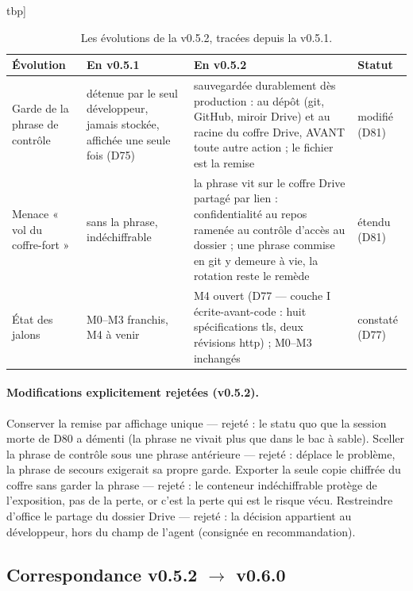 \begin{table}tbp]
\centering\small
\caption{Les évolutions de la v0.5.2, tracées depuis la v0.5.1.}
\label{tab:correspondance052}
\begin{tabularx}{\textwidth}{@{}l Y Y l@{}}
\toprule
\textbf{Évolution} & \textbf{En v0.5.1} & \textbf{En v0.5.2} & \textbf{Statut} \\
\midrule
Garde de la phrase de contrôle & détenue par le seul développeur, jamais stockée,
affichée une seule fois (D75) & sauvegardée durablement dès production :
 au dépôt (git, GitHub, miroir Drive) et au racine du
coffre Drive, AVANT toute autre action ; le fichier est la remise & modifié (D81) \\
Menace « vol du coffre-fort » & sans la phrase, indéchiffrable & la phrase vit sur le
coffre Drive partagé par lien : confidentialité au repos ramenée au contrôle d'accès au
dossier ; une phrase commise en git y demeure à vie, la rotation reste le remède &
étendu (D81) \\
État des jalons & M0–M3 franchis, M4 à venir & M4 ouvert (D77 — couche I
écrite-avant-code : huit spécifications tls, deux révisions http) ; M0–M3 inchangés &
constaté (D77) \\
\bottomrule
\end{tabularx}
\end{table}

\paragraph{Modifications explicitement rejetées (v0.5.2).} Conserver la remise par
affichage unique — rejeté : le statu quo que la session morte de D80 a démenti (la
phrase ne vivait plus que dans le bac à sable). Sceller la phrase de contrôle sous une
phrase antérieure — rejeté : déplace le problème, la phrase de secours exigerait sa
propre garde. Exporter la seule copie chiffrée du coffre sans garder la phrase — rejeté :
le conteneur indéchiffrable protège de l'exposition, pas de la perte, or c'est la perte
qui est le risque vécu. Restreindre d'office le partage du dossier Drive — rejeté : la
décision appartient au développeur, hors du champ de l'agent (consignée en
recommandation).

\subsection{Correspondance v0.5.2 $\to$ v0.6.0}\label{sec:evolutions060}

